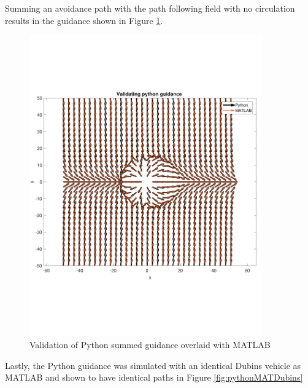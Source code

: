 \documentclass[numbered,pdftex]{ohio-etd}
\begin{document}
Summing an avoidance path with the path following field with no circulation results in the guidance shown in Figure \ref{fig:valPythonSummed}.



\begin{figure}[H]
	\centering
	\includegraphics[trim=0 140 0 140,clip,width=10cm]{PaperFigures/Methods/resultsPython/summedFields}
	\caption{Validation of Python summed guidance overlaid with MATLAB}
	\label{fig:valPythonSummed}
\end{figure}

Lastly, the Python guidance was simulated with an identical Dubins vehicle as MATLAB and shown to have identical paths in Figure \ref{fig:pythonMATDubins}
\end{document}
